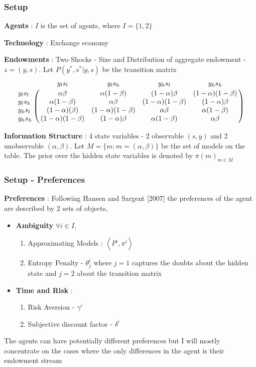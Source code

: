 \documentclass{beamer}
\theoremstyle{Definition}
\begin{document}
\begin{frame}
\frametitle{Setup}
	\begin{enumerate}
		\item \textbf{Agents}  : $I$ is the  set of agents, where $I= \{1,2\}$
		\item \textbf{Technology} : Exchange economy
		\item \textbf{Endowments}  : Two Shocks - Size and Distribution of aggregate endowment - $z=(y,s)$. Let $P(y^{*},s^* | y,s)$ be the transition matrix
		\tiny{
$$\bordermatrix{\text{}&y_ls_l&y_ls_h&y_hs_l&y_hs_h\cr
                y_ls_l&\alpha\beta&  \alpha(1-\beta)  & (1-\alpha)\beta& (1-\alpha)(1-\beta)\cr
                y_ls_h&   \alpha(1-\beta) &  \alpha\beta &(1-\alpha)(1-\beta) & (1-\alpha)\beta\cr
                y_hs_l&   (1-\alpha)(\beta) &  (1-\alpha)(1-\beta )&\alpha\beta & \alpha(1-\beta)\cr
                y_hs_h&  (1-\alpha)(1-\beta) &  (1-\alpha)\beta &\alpha(1-\beta) & \alpha\beta }$$}
                \normalsize{

\item \textbf{Information Structure} : 4 state variables  - 2 observable $(s,y)$ and  2 unobservable $(\alpha,\beta)$. Let $M=\{m : m=(\alpha,\beta)\}$ be the set of models on the table. The prior over the hidden state variables is denoted by $\pi(m)_{m \in M}$}
 	\end{enumerate}
\end{frame}

\begin{frame}
\frametitle{Setup - Preferences}
\textbf{Preferences} : Following Hansen and Sargent [2007] the preferences of the agent are described by 2 sets of objects, 
\begin{itemize}
	\item \textbf{Ambiguity}
%	
$\forall i \in I,$
\begin{enumerate}
	\item Approximating Models :   $\left\langle  P^i, \pi^i \right\rangle$
	\item Entropy Penalty - $\theta_j^i$ where $j=1$ captures the doubts about the hidden state and $j=2$ about the transition matrix
\end{enumerate}
\item \textbf{Time and Risk} :
\begin{enumerate}
	\item Risk Aversion - $\gamma^i$
	\item Subjective discount factor - $\delta^i$
\end{enumerate}
 \end{itemize}

\small{The agents can have potentially different preferences but I will mostly concentrate on the cases where the only differences in the agent is their endowment stream}
%
\end{frame}
\end{document}
